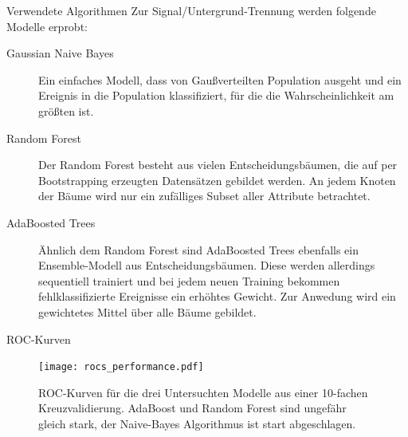 \documentclass[t]{beamer}
\begin{document}
\begin{columns}[onlytextwidth]
\begin{column}{0.5\textwidth}
      \begin{block}{Verwendete Algorithmen}
        Zur Signal/Untergrund-Trennung werden folgende Modelle erprobt:
        \begin{description}
          \item[Gaussian Naive Bayes] Ein einfaches Modell, dass von Gaußverteilten
            Population ausgeht und ein Ereignis in die Population klassifiziert, für
            die die Wahrscheinlichkeit am größten ist.
          \item[Random Forest] Der Random Forest \cite{rf} besteht aus vielen Entscheidungsbäumen,
            die auf per Bootstrapping erzeugten Datensätzen gebildet werden.
            An jedem Knoten der Bäume wird nur ein zufälliges Subset aller Attribute betrachtet.
          \item[AdaBoosted Trees] Ähnlich dem Random Forest sind AdaBoosted Trees \cite{adaboost}
            ebenfalls ein Ensemble-Modell aus Entscheidungsbäumen.
            Diese werden allerdings sequentiell trainiert und bei jedem neuen
            Training bekommen fehlklassifizierte Ereignisse ein erhöhtes Gewicht.
            Zur Anwedung wird ein gewichtetes Mittel über alle Bäume gebildet.
        \end{description}
      \end{block}
      \begin{block}{ROC-Kurven}
        \begin{multicols}{2}
          \begin{figure}
            \centering
            \texttt{[image: rocs\_performance.pdf]}
            \caption{ROC-Kurven für die drei Untersuchten Modelle aus einer 10-fachen
            Kreuzvalidierung. AdaBoost und Random Forest sind ungefähr gleich stark,
          der Naive-Bayes Algorithmus ist start abgeschlagen.}
            \label{fig:name}
          \end{figure}
          \begin{center}
            
          \end{center}
        \end{multicols}
      \end{block}


\end{column}
\end{columns}
\end{document}
